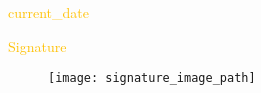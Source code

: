 \documentclass[12pt]{article}
\begin{document}
\begin{landscape}
\begin{Center}
{\fontsize{16pt}{19.2pt}\selectfont \textcolor[HTML]{FFC000}{current_date}\par}
\end{Center}\par


\vspace{\baselineskip}
\begin{Center}
{\fontsize{16pt}{19.2pt}\selectfont \textcolor[HTML]{FFC000}{Signature}\par}
\end{Center}\par

\begin{figure}[H]
	\begin{Center}
		\texttt{[image: signature\_image\_path]}
	\end{Center}
\end{figure}




\vspace{\baselineskip}
\end{landscape}
\end{document}
